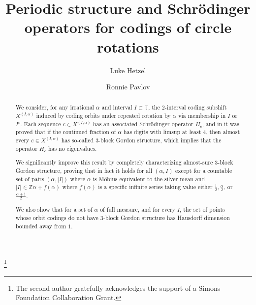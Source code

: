 \documentclass[11pt,reqno]{amsart}
\theoremstyle{definition}
\theoremstyle{plain}
\begin{document}
\title[Periodic structure and Schr\"{o}dinger operators for codings of circle rotations]{Periodic structure and Schr\"{o}dinger operators for codings of circle rotations}

\author{Luke Hetzel}
\address{Luke Hetzel\\
Department of Mathematics\\
University of Denver\\
2390 S. York St.\\
Denver, CO 80208}

\author{Ronnie Pavlov}
\address{Ronnie Pavlov\\
Department of Mathematics\\
University of Denver\\
2390 S. York St.\\
Denver, CO 80208}

\thanks{The second author gratefully acknowledges the support of a Simons Foundation Collaboration Grant.}

\renewcommand{\subjclassname}{MSC 2020}

\begin{abstract}
We consider, for any irrational $\alpha$ and interval $I \subset \mathbb{T}$, the 2-interval coding subshift 
$X^{(I, \alpha)}$ induced by coding orbits under repeated rotation by $\alpha$ via membership in $I$ or $I^c$. Each sequence $c \in X^{(I, \alpha)}$ has an associated Schr\"{o}dinger operator $H_c$, and in \cite{kaminaga} it was proved that if the continued fraction of $\alpha$ has digits with limsup at least $4$, then almost every $c \in X^{(I, \alpha)}$ has so-called $3$-block Gordon structure, which implies that the operator $H_c$ has no eigenvalues. 

We significantly improve this result by completely characterizing almost-sure $3$-block Gordon structure, proving that in fact it holds for all $(\alpha,I)$ except for a countable set of pairs $(\alpha, |I|)$ where $\alpha$ is M\"{o}bius equivalent to the silver mean and $|I| \in \mathbb{Z}\alpha + f(\alpha)$ where $f(\alpha)$ is a specific infinite series
taking value either $\frac{1}{2}, \frac{\alpha}{2}$, or $\frac{\alpha+1}{2}$.

We also show that for a set of $\alpha$ of full measure, and for every $I$, the set of points whose orbit codings do not have $3$-block Gordon structure has Hausdorff dimension bounded away from $1$.
\end{abstract}
\end{document}
